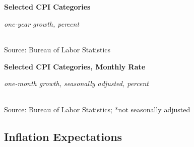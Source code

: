 \documentclass{report}
\begin{document}
{\begin{minipage}{0.76\textwidth} 
\small 
\vspace{1.5mm}

\normalsize \textbf{Selected CPI Categories}\\
\footnotesize{\textit{one-year growth, percent}\\
\hspace*{-3mm}  \setlength{\tabcolsep}{2.6pt} \color{black!90}
		{\renewcommand{\arraystretch}{1.5}
\begin{tabular}{p{42mm} R{8.0mm} R{8.0mm} R{8.0mm} R{8.0mm}
		 		 R{8.0mm} R{10.0mm} R{12.0mm}} %
			  \hline
		\end{tabular}}}
\vspace{-2mm}		
		
\footnotesize{Source: Bureau of Labor Statistics}
\end{minipage}
\newpage
\vspace*{-11mm}

\begin{minipage}{0.76\textwidth} 
\small 
\end{minipage}
\vspace{0.5mm}

\normalsize \textbf{Selected CPI Categories, Monthly Rate}\\
\footnotesize{\textit{one-month growth, seasonally adjusted, percent}\\
\hspace*{-3mm}  \setlength{\tabcolsep}{2.6pt} \color{black!90}
		{\renewcommand{\arraystretch}{1.38}
\begin{tabular}{p{38mm} R{8.2mm} R{8.2mm} R{8.2mm} R{8.2mm} R{8.2mm} R{8.2mm} 
		R{8.2mm} R{8.2mm}} %
			  \hline
		\end{tabular}}}
\vspace{-2mm}		
		
\footnotesize{Source: Bureau of Labor Statistics; *not seasonally adjusted
\newpage
\hypertarget{prie}{\label{prie}}
\vspace*{-9mm}

\begin{minipage}{0.76\textwidth}
\subsection*{Inflation Expectations}
\vspace{-1mm}


\end{minipage}}}
\end{document}
